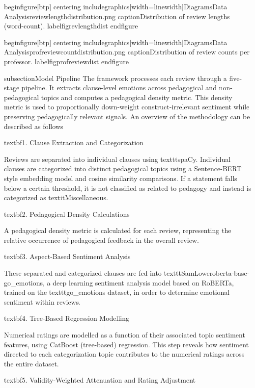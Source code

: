 begin{figure}[btp]  
    centering
    includegraphics[width=linewidth]{DiagramsData Analysisreviewlengthdistribution.png}
    caption{Distribution of review lengths (word-count).}
    label{figrevlengthdist}
end{figure}

begin{figure}[btp]  
    centering
    includegraphics[width=linewidth]{DiagramsData Analysisprofreviewcountdistribution.png}
    caption{Distribution of review counts per professor.}
    label{figprofreviewdist}
end{figure}

subsection{Model Pipeline}
The framework processes each review through a five-stage pipeline. It extracts clause-level emotions across pedagogical and non-pedagogical topics and computes a pedagogical density metric. This density metric is used to proportionally down-weight construct-irrelevant sentiment while preserving pedagogically relevant signals. An overview of the methodology can be described as follows

textbf{1. Clause Extraction and Categorization}

Reviews are separated into individual clauses using texttt{spaCy}. Individual clauses are categorized into distinct pedagogical topics using a Sentence-BERT style embedding model and cosine similarity comparisons. If a statement falls below a certain threshold, it is not classified as related to pedagogy and instead is categorized as textit{Miscellaneous}.

textbf{2. Pedagogical Density Calculations}

A pedagogical density metric is calculated for each review, representing the relative occurrence of pedagogical feedback in the overall review.

textbf{3. Aspect-Based Sentiment Analysis}

These separated and categorized clauses are fed into texttt{SamLoweroberta-base-go_emotions}, a deep learning sentiment analysis model based on RoBERTa, trained on the texttt{go_emotions} dataset, in order to determine emotional sentiment within reviews.

textbf{4. Tree-Based Regression Modelling}

Numerical ratings are modelled as a function of their associated topic sentiment features, using CatBoost (tree-based) regression. This step reveals how sentiment directed to each categorization topic contributes to the numerical ratings across the entire dataset.

textbf{5. Validity-Weighted Attenuation and Rating Adjustment}

